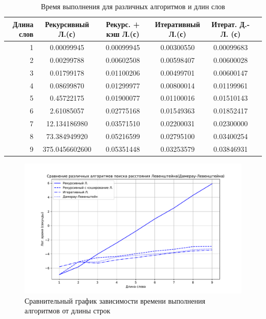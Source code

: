\begin{table}[H]
    \centering
    \small
    \begin{tabular}{@{}rccccc@{}}
        \toprule
        Длина слов & Рекурсивный Л.(с) & Рекурс. + кэш Л.(с) & Итеративный Л.(с) & Итерат. Д.-Л. (с) \\ \midrule
        1          & 0.00099945   & 0.00099945 & 0.00300550             & 0.00099683      \\
        2          & 0.00299788   & 0.00602508 & 0.00598407             & 0.00600028      \\
        3          & 0.01799178   & 0.01100206 & 0.00499701             & 0.00600147      \\
        4          & 0.08699870   & 0.01299977 & 0.00800014             & 0.01199961      \\
        5          & 0.45722175   & 0.01900077 & 0.01100016             & 0.01510143      \\
        6          & 2.61085057    & 0.02775168 & 0.01549363             & 0.01852417      \\
        7          & 12.134186980   & 0.03571510 & 0.02200031             & 0.02300000      \\
        8          & 73.384949920   & 0.05216599 & 0.02795100             & 0.03400254      \\
        9          & 375.0456602600  & 0.05351448 & 0.03253579             & 0.03846931      \\ \bottomrule
    \end{tabular}
    \caption{Время выполнения для различных алгоритмов и длин слов}
    \label{tab:performance}
\end{table}

\begin{figure}[H]
    \raggedright    
    \includegraphics[width=180mm]{images/graph_comparation}
    \caption{Сравнительный график зависимости времени выполнения алгоритмов от длины строк}
    \label{images:graph_comparation}
\end{figure}



